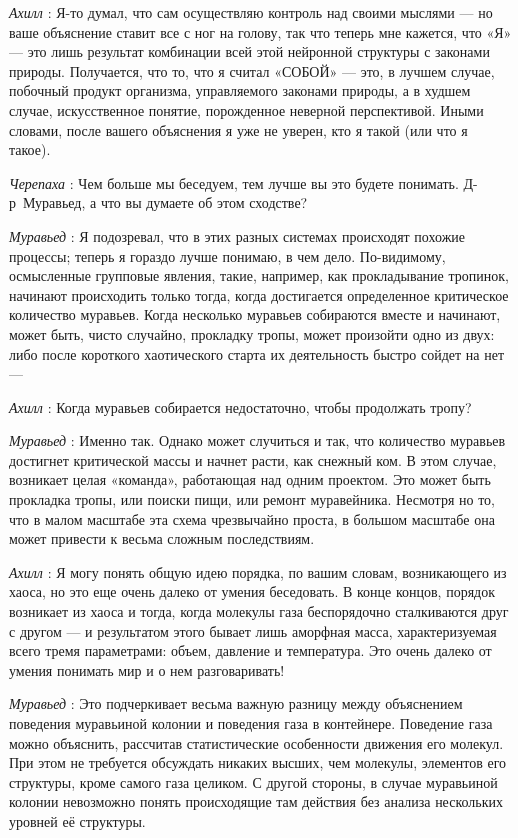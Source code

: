 \documentclass[../main.tex]{subfiles}
\begin{document}
\begin{dialogue}
\emph{Ахилл} : Я-то думал, что сам осуществляю контроль над своими мыслями --- но ваше объяснение ставит все с ног на голову, так что теперь мне кажется, что «Я» --- это лишь результат комбинации всей этой нейронной структуры с законами природы. Получается, что то, что я считал «СОБОЙ» --- это, в лучшем случае, побочный продукт организма, управляемого законами природы, а в худшем случае, искусственное понятие, порожденное неверной перспективой. Иными словами, после вашего объяснения я уже не уверен, кто я такой (или что я такое).

\emph{Черепаха} : Чем больше мы беседуем, тем лучше вы это будете понимать. Д-р~Муравьед, а что вы думаете об этом сходстве?

\emph{Муравьед} : Я подозревал, что в этих разных системах происходят похожие процессы; теперь я гораздо лучше понимаю, в чем дело. По-видимому, осмысленные групповые явления, такие, например, как прокладывание тропинок, начинают происходить только тогда, когда достигается определенное критическое количество муравьев. Когда несколько муравьев собираются вместе и начинают, может быть, чисто случайно, прокладку тропы, может произойти одно из двух: либо после короткого хаотического старта их деятельность быстро сойдет на нет ---

\emph{Ахилл} : Когда муравьев собирается недостаточно, чтобы продолжать тропу?

\emph{Муравьед} : Именно так. Однако может случиться и так, что количество муравьев достигнет критической массы и начнет расти, как снежный ком. В этом случае, возникает целая «команда», работающая над одним проектом. Это может быть прокладка тропы, или поиски пищи, или ремонт муравейника. Несмотря но то, что в малом масштабе эта схема чрезвычайно проста, в большом масштабе она может привести к весьма сложным последствиям.

\emph{Ахилл} : Я могу понять общую идею порядка, по вашим словам, возникающего из хаоса, но это еще очень далеко от умения беседовать. В конце концов, порядок возникает из хаоса и тогда, когда молекулы газа беспорядочно сталкиваются друг с другом --- и результатом этого бывает лишь аморфная масса, характеризуемая всего тремя параметрами: объем, давление и температура. Это очень далеко от умения понимать мир и о нем разговаривать!

\emph{Муравьед} : Это подчеркивает весьма важную разницу между объяснением поведения муравьиной колонии и поведения газа в контейнере. Поведение газа можно объяснить, рассчитав статистические особенности движения его молекул. При этом не требуется обсуждать никаких высших, чем молекулы, элементов его структуры, кроме самого газа целиком. С другой стороны, в случае муравьиной колонии невозможно понять происходящие там действия без анализа нескольких уровней её структуры.


\end{dialogue}
\end{document}
